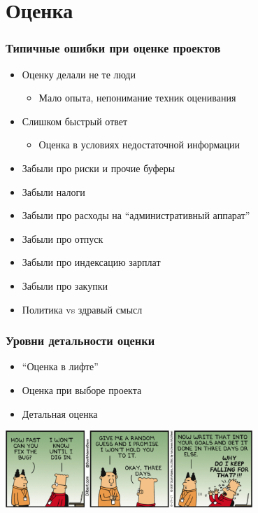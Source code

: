 \documentclass{../../slides-style}
\begin{document}
    \section{Оценка}

    \begin{frame}
        \frametitle{Типичные ошибки при оценке проектов}
        \begin{itemize}
            \item Оценку делали не те люди
            \begin{itemize}
                \item Мало опыта, непонимание техник оценивания
            \end{itemize}
            \item Слишком быстрый ответ
            \begin{itemize}
                \item Оценка в условиях недостаточной информации
            \end{itemize}
            \item Забыли про риски и прочие буферы
            \item Забыли налоги
            \item Забыли про расходы на ``административный аппарат''
            \item Забыли про отпуск
            \item Забыли про индексацию зарплат
            \item Забыли про закупки
            \item Политика vs здравый смысл
        \end{itemize}
    \end{frame}

    \begin{frame}
        \frametitle{Уровни детальности оценки}
        \begin{itemize}
            \item ``Оценка в лифте''
            \item Оценка при выборе проекта
            \item Детальная оценка
        \end{itemize}
        \begin{center}
            \includegraphics[width=0.7\textwidth]{dilbertEstimation.png}
        \end{center}
    \end{frame}
\end{document}
